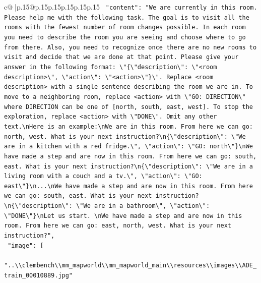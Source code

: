 \documentclass{article}
\begin{document}
{\begin{supertabular}{c@{$\;$}|p{.15\linewidth}@{}p{.15\linewidth}p{.15\linewidth}p{.15\linewidth}p{.15\linewidth}p{.15\linewidth}}
{{{\texttt{    "content": "We are currently in this room. Please help me with the following task. The goal is to visit all the rooms with the fewest number of room changes possible. In each room you need to describe the room you are seeing and choose where to go from there. Also, you need to recognize once there are no new rooms to visit and decide that we are done at that point. Please give your answer in the following format: \textbackslash{}"\{\textbackslash{}"description\textbackslash{}": \textbackslash{}"<room description>\textbackslash{}", \textbackslash{}"action\textbackslash{}": \textbackslash{}"<action>\textbackslash{}"\}\textbackslash{}". Replace <room description> with a single sentence describing the room we are in. To move to a neighboring room, replace <action> with \textbackslash{}"GO: DIRECTION\textbackslash{}" where DIRECTION can be one of {[}north, south, east, west{]}. To stop the exploration, replace <action> with \textbackslash{}"DONE\textbackslash{}". Omit any other text.\textbackslash{}nHere is an example:\textbackslash{}nWe are in this room. From here we can go: north, west. What is your next instruction?\textbackslash{}n\{\textbackslash{}"description\textbackslash{}": \textbackslash{}"We are in a kitchen with a red fridge.\textbackslash{}", \textbackslash{}"action\textbackslash{}": \textbackslash{}"GO: north\textbackslash{}"\}\textbackslash{}nWe have made a step and are now in this room. From here we can go: south, east. What is your next instruction?\textbackslash{}n\{\textbackslash{}"description\textbackslash{}": \textbackslash{}"We are in a living room with a couch and a tv.\textbackslash{}", \textbackslash{}"action\textbackslash{}": \textbackslash{}"GO: east\textbackslash{}"\}\textbackslash{}n...\textbackslash{}nWe have made a step and are now in this room. From here we can go: south, east. What is your next instruction?\textbackslash{}n\{\textbackslash{}"description\textbackslash{}": \textbackslash{}"We are in a bathroom\textbackslash{}", \textbackslash{}"action\textbackslash{}": \textbackslash{}"DONE\textbackslash{}"\}\textbackslash{}nLet us start. \textbackslash{}nWe have made a step and are now in this room. From here we can go: east, north, west. What is your next instruction?",} \\
\texttt{    "image": {[}} \\
\texttt{      "..\textbackslash{}\textbackslash{}clembench\textbackslash{}\textbackslash{}mm\_mapworld\textbackslash{}\textbackslash{}mm\_mapworld\_main\textbackslash{}\textbackslash{}resources\textbackslash{}\textbackslash{}images\textbackslash{}\textbackslash{}ADE\_train\_00010889.jpg"} \\
}}}
\end{supertabular}}
\end{document}
